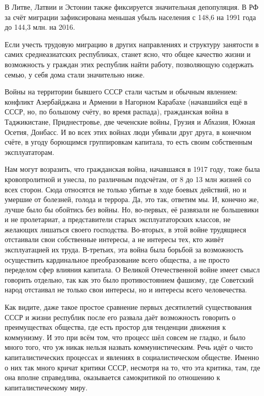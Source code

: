 \documentclass[12pt,a4paper,openany]{book}
\begin{document}
В Литве, Латвии и Эстонии также фиксируется значительная депопуляция. В РФ за счёт миграции зафиксирована меньшая убыль населения с 148,6 на 1991 года до 144,3 млн. на 2016.

Если учесть трудовую миграцию в других направлениях и структуру занятости в самих среднеазиатских республиках, станет ясно, что общее качество жизни и возможность у граждан этих республик найти работу, позволяющую содержать семью, у себя дома стали значительно ниже.

Войны на территории бывшего СССР стали частым и обычным явлением: конфликт Азербайджана и Армении в Нагорном Карабахе (начавшийся ещё в СССР, но, по большому счёту, во время распада), гражданская война в Таджикистане, Приднестровье, две чеченские войны, Грузия и Абхазия, Южная Осетия, Донбасс. И во всех этих войнах люди убивали друг друга, в конечном счёте, в угоду борющимся группировкам капитала, то есть своим собственным эксплуататорам.

Нам могут возразить, что гражданская война, начавшаяся в 1917 году, тоже была кровопролитной и унесла, по различным подсчётам, от 8 до 13 млн жизней со всех сторон. Сюда относятся не только убитые в ходе боевых действий, но и умершие от болезней, голода и террора. Да, это так, ответим мы. И, конечно же, лучше было бы обойтись без войны. Но, во-первых, её развязали не большевики и не пролетариат, а представители старых эксплуататорских классов, не желающих лишаться своего господства. Во-вторых, в этой войне трудящиеся отстаивали свои собственные интересы, а не интересы тех, кто живёт эксплуатацией их труда. В-третьих, эта война была борьбой за возможность осуществить кардинальное преобразование всего общества, а не просто переделом сфер влияния капитала. О Великой Отечественной войне имеет смысл говорить отдельно, так как это было противостоянием фашизму, где Советский народ отстаивал не только свои интересы, но и интересы всего человечества.

Как видите, даже такое простое сравнение первых десятилетий существования СССР и жизни республик после его развала даёт возможность говорить о преимуществах общества, где есть простор для тенденции движения к коммунизму. И это при всём том, что процесс шёл совсем не гладко, и было много того, что уж никак нельзя назвать коммунистическим. Речь идёт о чисто капиталистических процессах и явлениях в социалистическом обществе. Именно о них так много кричат критики СССР, несмотря на то, что эта критика, там, где она вполне справедлива, оказывается самокритикой по отношению к капиталистическому миру.
\end{document}
